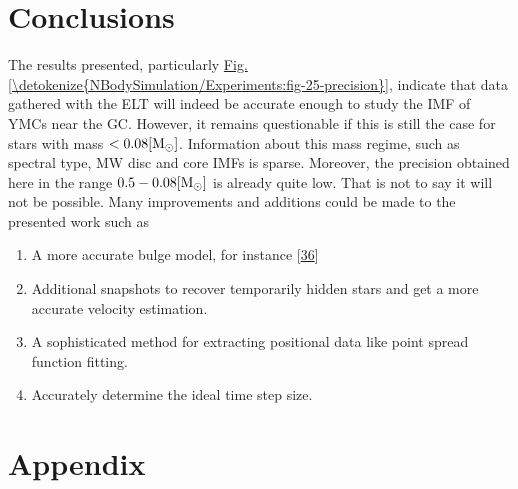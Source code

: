 \documentclass[letterpaper,10pt,english]{sphinxmanual}
\begin{document}
\chapter{Conclusions}
\label{\detokenize{NBodySimulation/Conclusions:conclusions}}\label{\detokenize{NBodySimulation/Conclusions::doc}}
\sphinxAtStartPar
The results presented, particularly \hyperref[\detokenize{NBodySimulation/Experiments:fig-25-precision}]{Fig.\@ \ref{\detokenize{NBodySimulation/Experiments:fig-25-precision}}}, indicate that data gathered with the ELT will indeed be accurate enough to study the IMF of YMCs near the GC.
However, it remains questionable if this is still the case for stars with mass \(< 0.08 [\textup{M}_\odot]\).
Information about this mass regime, such as spectral type, MW disc and core IMFs is sparse.
Moreover, the precision obtained here in the range \(0.5 - 0.08 [\textup{M}_{\odot}]\) is already quite low.
That is not to say it will not be possible. Many improvements and additions could be made to the presented work such as
\begin{enumerate}
%
\item {} 
\sphinxAtStartPar
A more accurate bulge model, for instance {[}\hyperlink{cite.NBodySimulation/Appendix:id57}{36}{]}

\item {} 
\sphinxAtStartPar
Additional snapshots to recover temporarily hidden stars and get a more accurate velocity estimation.

\item {} 
\sphinxAtStartPar
A sophisticated method for extracting positional data like point spread function fitting.

\item {} 
\sphinxAtStartPar
Accurately determine the ideal time step size.

\end{enumerate}


\chapter{Appendix}
\label{\detokenize{NBodySimulation/Appendix:appendix}}\label{\detokenize{NBodySimulation/Appendix:appendix-label}}\label{\detokenize{NBodySimulation/Appendix::doc}}
\end{document}
